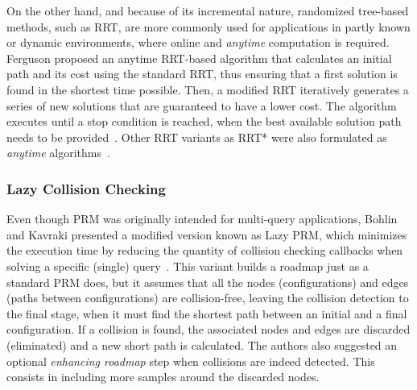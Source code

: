 On the other hand, and because of its incremental nature, randomized tree-based
methods, such as \ac{RRT}, are more commonly used for applications in partly
known or dynamic environments, where online and \textit{anytime} computation is
required. Ferguson \etal proposed an anytime RRT-based algorithm that calculates
an initial path and its cost using the standard \ac{RRT}, thus ensuring that a
first solution is found in the shortest time possible. Then, a modified \ac{RRT}
iteratively generates a series of new solutions that are guaranteed to have a
lower cost. The algorithm executes until a stop condition is reached, \eg when
the best available solution path needs to be
provided~\cite{Ferguson2006,Ferguson2007}. Other RRT variants as \ac{RRT*} were
also formulated as \textit{anytime} algorithms~\cite{Karaman2011a}.

% 

\subsubsection{Lazy Collision Checking}
\label{sec:lazy_collision_check}

Even though \ac{PRM} was originally intended for multi-query applications,
Bohlin and Kavraki presented a modified version known as Lazy PRM, which
minimizes the execution time by reducing the quantity of collision checking
callbacks when solving a specific (single) query~\cite{Bohlin2000,Bohlin2001}.
This variant builds a roadmap just as a standard \ac{PRM} does, but it assumes
that all the nodes (configurations) and edges (paths between configurations) are
collision-free, leaving the collision detection to the final stage, \ie when it
must find the shortest path between an initial and a final configuration. If a
collision is found, the associated nodes and edges are discarded (eliminated)
and a new short path is calculated. The authors also suggested an optional
\textit{enhancing roadmap} step when collisions are indeed detected. This
consists in including more samples around the discarded nodes.

